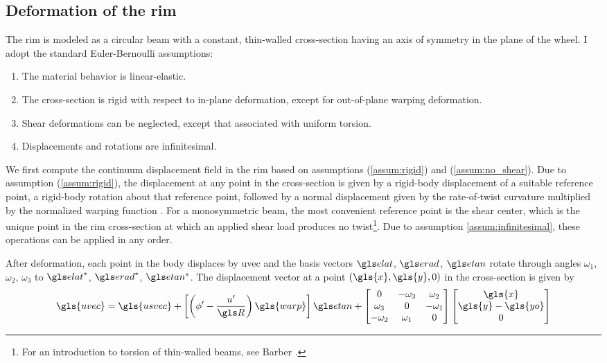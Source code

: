 \documentclass[\rootdir/thesis.tex]{subfiles}
\begin{document}
\subsection{Deformation of the rim}
\label{sec:rim_strain_energy}

The rim is modeled as a circular beam with a constant, thin-walled cross-section having an axis of symmetry in the plane of the wheel. I adopt the standard Euler-Bernoulli assumptions:

\begin{enumerate}
	\item{The material behavior is linear-elastic.}\label{assum:elastic}
	\item{The cross-section is rigid with respect to in-plane deformation, except for out-of-plane warping deformation.}\label{assum:rigid}
	\item{Shear deformations can be neglected, except that associated with uniform torsion.}\label{assum:no_shear}
	\item{Displacements and rotations are infinitesimal.}\label{assum:infinitesimal}
\end{enumerate}

We first compute the continuum displacement field in the rim based on assumptions (\ref{assum:rigid}) and (\ref{assum:no_shear}). Due to assumption (\ref{assum:rigid}), the displacement at any point in the cross-section is given by a rigid-body displacement of a suitable reference point, a rigid-body rotation about that reference point, followed by a normal displacement given by the rate-of-twist curvature multiplied by the normalized warping function \cite{warping mechanics}. For a monosymmetric beam, the most convenient reference point is the shear center, which is the unique point in the rim cross-section at which an applied shear load produces no twist\footnote{For an introduction to torsion of thin-walled beams, see Barber \cite{Barber2011}.}. Due to assumption \ref{assum:infinitesimal}, these operations can be applied in any order.

After deformation, each point in the body displaces by \gls{uvec} and the basis vectors $\eo$, $\et$, $\eh$ rotate through angles $\omega_1$, $\omega_2$, $\omega_3$ to $\eo^*$, $\et^*$, $\eh^*$. The displacement vector at a point $(\gls{x}, \gls{y}, 0)$ in the cross-section is given by
\begin{equation}
\label{eq:u}
\gls{uvec} = \gls{usvec} + \left[\left(\phi' - \frac{u'}{\R}\right)\gls{warp}\right]\eh +
\begin{bmatrix}
0        & -\omega_3& \omega_2\\
\omega_3 & 0        & -\omega_1\\
-\omega_2& \omega_1 & 0
\end{bmatrix}
\begin{bmatrix}\gls{x}\\\gls{y} - \gls{yo}\\0\end{bmatrix}
\end{equation}
\end{document}
